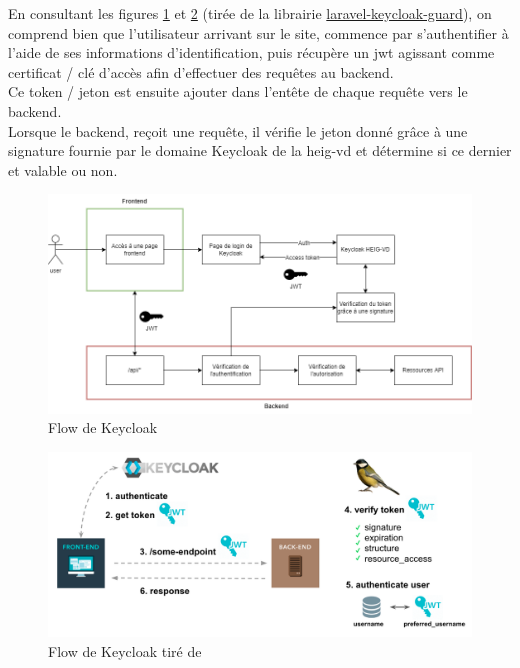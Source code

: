\documentclass[
    iai, %
    il, %
]{heig-tb}
\begin{document}
En consultant les figures \ref{keycloak-flow.drawio} et \ref{keycloak-flow-lib} (tirée de la librairie \href{https://github.com/robsontenorio/laravel-keycloak-guard}{laravel-keycloak-guard}), on comprend bien que l'utilisateur arrivant sur le site, commence par s'authentifier à l'aide de ses informations d'identification, puis récupère un \Gls{jwt} agissant comme certificat / clé d'accès afin d'effectuer des requêtes au \Gls{backend}. \\
Ce token / jeton est ensuite ajouter dans l'entête de chaque requête vers le \Gls{backend}. \\
Lorsque le \Gls{backend}, reçoit une requête, il vérifie le jeton donné grâce à une signature fournie par le domaine Keycloak de la \Gls{heig-vd} et détermine si ce dernier et valable ou non.

\begin{center}
    \begin{figure}
        \includegraphics[width=\textwidth]{./assets/figures/keycloak-flow.drawio.png}
        \caption{Flow de Keycloak \label{keycloak-flow.drawio}}
    \end{figure}
\end{center}

\begin{center}
    \begin{figure}
        \includegraphics[width=\textwidth]{./assets/figures/keycloak-flow-lib.png}
        \caption{Flow de Keycloak tiré de \label{keycloak-flow-lib}}
    \end{figure}
\end{center}
\end{document}
